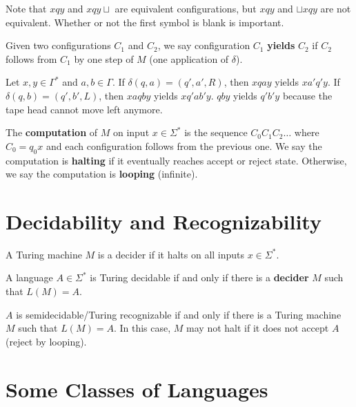 Note that $xqy$ and $xqy \sqcup$ are equivalent configurations, but $xqy$ and $\sqcup xqy$ are not equivalent. Whether or not the first symbol is blank is important.

\begin{definition}
    Given two configurations $C_1$ and $C_2$, we say configuration $C_1$ \textbf{yields} $C_2$ if $C_2$ follows from $C_1$ by one step of $M$ (one application of $\delta$).
\end{definition}

\begin{example}
    Let $x,y \in \Gamma^*$ and $a,b \in \Gamma$. If $\delta(q,a) = (q',a',R)$, then $xqay$ yields $xa'q'y$. If $\delta(q,b) = (q',b',L)$, then $xaqby$ yields $xq'ab'y$. $qby$ yields $q'b'y$ because the tape head cannot move left anymore.
\end{example}

\begin{definition}[Computation]
    The \textbf{computation} of $M$ on input $x \in \Sigma^*$ is the sequence $C_0C_1C_2\ldots$ where $C_0 = q_0x$ and each configuration follows from the previous one. We say the computation is \textbf{halting} if it eventually reaches accept or reject state. Otherwise, we say the computation is \textbf{looping} (infinite).
\end{definition}

\section{Decidability and Recognizability}

\begin{definition}[Decider]
    A Turing machine $M$ is a decider if it halts on all inputs $x \in \Sigma^*$.
\end{definition}

\begin{definition}
    A language $A \in \Sigma^*$ is Turing decidable if and only if there is a \textbf{decider} $M$ such that $L(M)=A$.

    $A$ is semidecidable/Turing recognizable if and only if there is a Turing machine $M$ such that $L(M)=A$. In this case, $M$ may not halt if it does not accept $A$ (reject by looping).
\end{definition}

\section{Some Classes of Languages}

